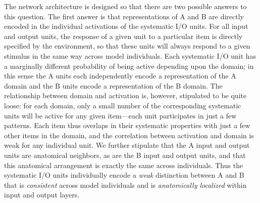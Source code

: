 The network architecture is designed so that there are two possible answers to this question. The first answer is that representations of A and B are directly encoded in the individual activations of the systematic I/O units. For all input and output units, the response of a given unit to a particular item is directly specified by the environment, so that these units will always respond to a given stimulus in the same way across model individuals. Each systematic I/O unit has a marginally different probability of being active depending upon the domain; in this sense the A units each independently encode a representation of the A domain and the B units encode a representation of the B domain. The relationship between domain and activation is, however, stipulated to be quite loose: for each domain, only a small number of the corresponding systematic units will be active for any given item---each unit participates in just a few patterns. Each item thus overlaps in their systematic properties with just a few other items in the domain, and the correlation between activation and domain is weak for any individual unit.  We further stipulate that the A input and output units are anatomical neighbors, as are the B input and output units, and that this anatomical arrangement is exactly the same across individuals. Thus the systematic I/O units individually encode a {\em weak} distinction between A and B that is {\em consistent} across model individuals and is {\em anatomically localized} within input and output layers.

